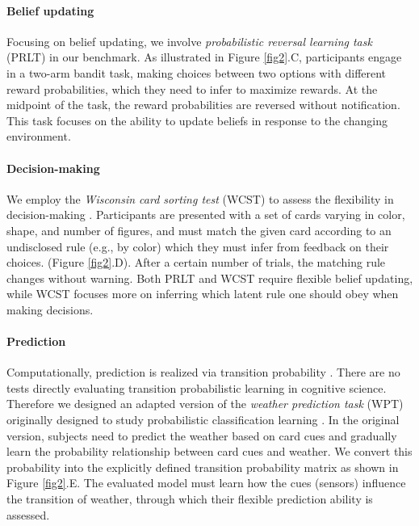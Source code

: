 \paragraph{Belief updating} Focusing on belief updating, we involve \textit{probabilistic reversal learning task} (PRLT) \cite{costa2015reversal} in our benchmark. As illustrated in Figure \ref{fig2}.C, participants engage in a two-arm bandit task, making choices between two options with different reward probabilities, which they need to infer to maximize rewards. At the midpoint of the task, the reward probabilities are reversed without notification. This task focuses on the ability to update beliefs in response to the changing environment. 

\paragraph{Decision-making} We employ the \textit{Wisconsin card sorting test} (WCST) to assess the flexibility in decision-making \cite{nyhus2009wisconsin}. Participants are presented with a set of cards varying in color, shape, and number of figures, and must match the given card according to an undisclosed rule (e.g., by color) which they must infer from feedback on their choices. (Figure \ref{fig2}.D). After a certain number of trials, the matching rule changes without warning. Both PRLT and WCST require flexible belief updating, while WCST focuses more on inferring which latent rule one should obey when making decisions.

\paragraph{Prediction} Computationally, prediction is realized via transition probability \cite{friston2010free}. There are no tests directly evaluating transition probabilistic learning in cognitive science. Therefore we designed an adapted version of the \textit{weather prediction task }(WPT) originally designed to study probabilistic classification learning \cite{shohamy2008basal}. In the original version, subjects need to predict the weather based on card cues and gradually learn the probability relationship between card cues and weather. We convert this probability into the explicitly defined transition probability matrix as shown in Figure \ref{fig2}.E. The evaluated model must learn how the cues (sensors) influence the transition of weather, through which their flexible prediction ability is assessed.

